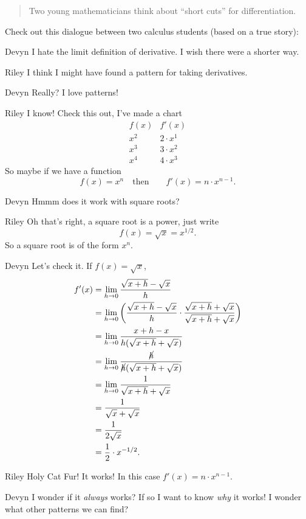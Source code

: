 \documentclass{ximera}
\begin{document}
\begin{abstract}
Two young mathematicians think about ``short cuts'' for differentiation.
\end{abstract}
\maketitle

Check out this dialogue between two calculus students (based on a true
story):

\begin{dialogue}
\item[Devyn] I hate the limit definition of derivative.  I wish there
  were a shorter way.
\item[Riley] I think I might have found a pattern for taking
  derivatives.
\item[Devyn] Really? I love patterns!
\item[Riley] I know! Check this out, I've made a chart
{  \renewcommand*{\arraystretch}{1.3}
  \[
  \begin{array}{c|c}
    f(x) & f'(x)\\ \hline
    x^2 & 2\cdot x^1\\
    x^3 & 3\cdot x^2\\
    x^4 & 4\cdot x^3
  \end{array}
  \]
  }
  So maybe if we have a function
  \[
  f(x) = x^n\quad\text{then}\qquad f'(x) = n\cdot x^{n-1}.
  \]
\item[Devyn] Hmmm does it work with square roots?
\item[Riley] Oh that's right, a square root is a power, just write
  \[
  f(x) = \sqrt{x} = x^{1/2}.
  \]
  So a square root is of the form $x^n$.
\item[Devyn] Let's check it. If $f(x) = \sqrt{x}$,
  \begin{align*}
    f'(x) &= \lim_{h\to 0} \frac{\sqrt{x+h} -\sqrt{x}}{h}\\
    &= \lim_{h\to 0} \left(\frac{\sqrt{x+h} - \sqrt{x}}{h}\cdot \frac{\sqrt{x+h} + \sqrt{x}}{\sqrt{x+h} + \sqrt{x}}\right)\\
    &= \lim_{h\to 0} \frac{x+h - x}{h(\sqrt{x+h} + \sqrt{x})}\\
    &= \lim_{h\to 0} \frac{\cancel{h}}{\cancel{h}(\sqrt{x+h} + \sqrt{x})}\\
    &= \lim_{h\to 0} \frac{1}{\sqrt{x+h} + \sqrt{x}}\\
    &= \frac{1}{\sqrt{x} + \sqrt{x}}\\
    &= \frac{1}{2\sqrt{x}}\\
    &= \frac{1}{2}\cdot x^{-1/2}.
  \end{align*}
\item[Riley] Holy Cat Fur! It works! In this case $f'(x) = n\cdot
  x^{n-1}$.
  \item[Devyn] I wonder if it \textit{always} works? If so I want to
    know \textit{why} it works! I wonder what other patterns we can
    find?
\end{dialogue}
\end{document}
